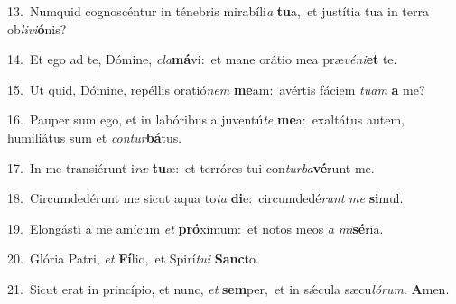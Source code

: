 {\numbfont\textcolor{\numbcolor}{13.}}~Numquid cognoscéntur in ténebris mirabíli\textit{a} \textbf{tu}\-a,~\star et justítia tua in terra ob\-\textit{li}\-\textit{vi}\textbf{ó}nis?\par
{\numbfont\textcolor{\numbcolor}{14.}}~Et ego ad te, Dómine, \textit{cla}\-\textbf{má}vi:~\star et mane orátio mea præ\-\textit{vé}\-\textit{ni}\textbf{et} te.\par
{\numbfont\textcolor{\numbcolor}{15.}}~Ut quid, Dómine, repéllis oratió\textit{nem} \textbf{me}\-am:~\star avértis fáciem \textit{tu}\-\textit{am} \textbf{a} me?\par
{\numbfont\textcolor{\numbcolor}{16.}}~Pauper sum ego, et in labóribus a juventú\textit{te} \textbf{me}\-a:~\star exaltátus autem, humiliátus sum et \textit{con}\-\textit{tur}\textbf{bá}tus.\par
{\numbfont\textcolor{\numbcolor}{17.}}~In me transiérunt i\textit{ræ} \textbf{tu}\-æ:~\star et terróres tui con\-\textit{tur}\-\textit{ba}\textbf{vé}runt me.\par
{\numbfont\textcolor{\numbcolor}{18.}}~Circumdedérunt me sicut aqua to\textit{ta} \textbf{di}\-e:~\star circumdedé\textit{runt} \textit{me} \textbf{si}\-mul.\par
{\numbfont\textcolor{\numbcolor}{19.}}~Elongásti a me amícum \textit{et} \textbf{pró}\-ximum:~\star et notos meos \textit{a} \textit{mi}\-\textbf{sé}ria.\par
{\numbfont\textcolor{\numbcolor}{20.}}~Glória Patri, \textit{et} \textbf{Fí}\-lio,~\star et Spirí\-\textit{tu}\-\textit{i} \textbf{Sanc}\-to.\par
{\numbfont\textcolor{\numbcolor}{21.}}~Sicut erat in princípio, et nunc, \textit{et} \textbf{sem}\-per,~\star et in sǽcula sæcu\-\textit{ló}\-\textit{rum}. \textbf{A}\-men.\par
